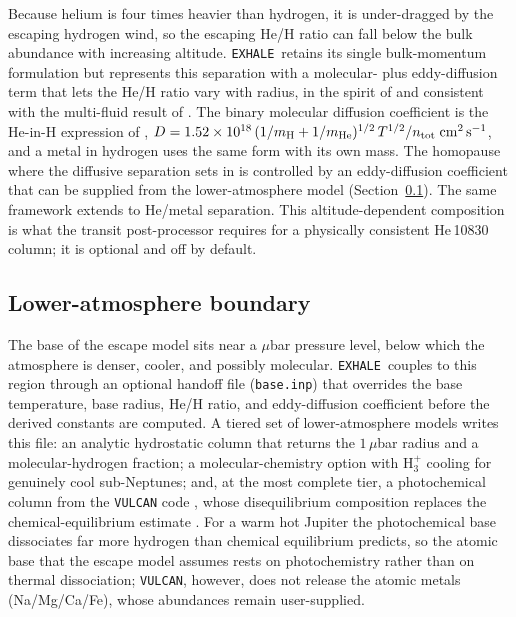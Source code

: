 \documentclass[twocolumn]{aastex702}
\newcommand{\EXHALE}{\texttt{EXHALE}}
\begin{document}
Because helium is four times heavier than hydrogen, it is under-dragged by the escaping
hydrogen wind, so the escaping He/H ratio can fall below the bulk abundance with
increasing altitude. \EXHALE\ retains its single bulk-momentum formulation but represents
this separation with a molecular- plus eddy-diffusion term that lets the He/H ratio vary
with radius, in the spirit of \citet{Taylor2025} and consistent with the multi-fluid
result of \citet{Xing2023}. The binary molecular diffusion coefficient is the
He-in-H expression of \citet{BanksKockarts1973},
$D=1.52\times10^{18}\,(1/m_{\rm H}+1/m_{\rm He})^{1/2}\,T^{1/2}/n_{\rm tot}
\;{\rm cm^{2}\,s^{-1}}$, and a metal in hydrogen uses the same form with its own mass.
The homopause where the diffusive separation sets in is
controlled by an eddy-diffusion coefficient that can be supplied from the lower-atmosphere
model (Section~\ref{sec:lower}). The same framework extends to He/metal separation. This
altitude-dependent composition is what the transit post-processor requires for a
physically consistent \mbox{He\,10830} column; it is optional and off by default.

\subsection{Lower-atmosphere boundary}
\label{sec:lower}

The base of the escape model sits near a $\mu$bar pressure level, below which the
atmosphere is denser, cooler, and possibly molecular. \EXHALE\ couples to this region
through an optional handoff file (\texttt{base.inp}) that overrides the base temperature,
base radius, He/H ratio, and eddy-diffusion coefficient before the derived constants are
computed. A tiered set of lower-atmosphere models writes this file: an analytic
hydrostatic column that returns the $1\,\mu$bar radius and a molecular-hydrogen fraction;
a molecular-chemistry option with $\mathrm{H_3^+}$ cooling for genuinely cool
sub-Neptunes; and, at the most complete tier, a photochemical column from the
\texttt{VULCAN} code \citep{Tsai2017}, whose disequilibrium composition replaces the
chemical-equilibrium estimate \citep{Visscher2006,Moses2011}. For a warm hot Jupiter the
photochemical base dissociates far more hydrogen than chemical equilibrium predicts, so
the atomic base that the escape model assumes rests on photochemistry rather than on
thermal dissociation; \texttt{VULCAN}, however, does not release the atomic metals
(Na/Mg/Ca/Fe), whose abundances remain user-supplied.
\end{document}
